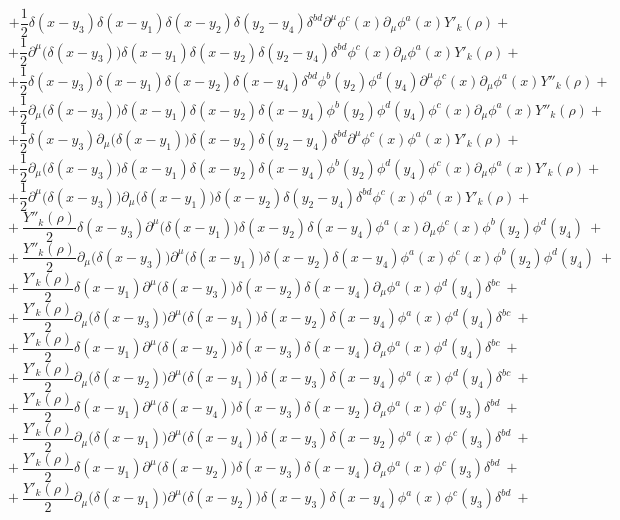 $$+ \frac{1}{2}\delta(x - y_3)\delta(x - y_1)\delta(x - y_2)\delta(y_2- y_4)\delta^{bd}\partial^\mu\phi^c(x)\partial_\mu\phi^a(x)Y'_k(\rho) + $$
$$+ \frac{1}{2}\partial^\mu\big(\delta(x - y_3)\big)\delta(x - y_1)\delta(x - y_2)\delta(y_2- y_4)\delta^{bd}\phi^c(x)\partial_\mu\phi^a(x)Y'_k(\rho) + $$
$$+ \frac{1}{2}\delta(x - y_3)\delta(x - y_1)\delta(x - y_2)\delta(x- y_4)\delta^{bd}\phi^b(y_2)\phi^d(y_4)\partial^\mu\phi^c(x)\partial_\mu\phi^a(x)Y''_k(\rho) + $$
$$+ \frac{1}{2}\partial_\mu\big(\delta(x - y_3)\big)\delta(x - y_1)\delta(x - y_2)\delta(x- y_4)\phi^b(y_2)\phi^d(y_4)\phi^c(x)\partial_\mu\phi^a(x)Y''_k(\rho) + $$
$$+ \frac{1}{2}\delta(x - y_3)\partial_\mu\big(\delta(x - y_1)\big)\delta(x - y_2)\delta(y_2 - y_4)\delta^{bd}\partial^\mu\phi^c(x)\phi^a(x)Y'_k(\rho) + $$
$$+ \frac{1}{2}\partial_\mu\big(\delta(x - y_3)\big)\delta(x - y_1)\delta(x - y_2)\delta(x- y_4)\phi^b(y_2)\phi^d(y_4)\phi^c(x)\partial_\mu\phi^a(x)Y'_k(\rho) + $$
$$+ \frac{1}{2}\partial^\mu\big(\delta(x - y_3)\big)\partial_\mu\big(\delta(x - y_1)\big)\delta(x - y_2)\delta(y_2- y_4)\delta^{bd}\phi^c(x)\phi^a(x)Y'_k(\rho) + $$
$$+\ \frac{Y''_k(\rho)}{2}\delta(x - y_3)\partial^\mu\big(\delta(x - y_1)\big)\delta(x - y_2)\delta(x - y_4)\phi^a(x)\partial_\mu\phi^c(x)\phi^b(y_2)\phi^d(y_4) \ +$$
$$+\ \frac{Y''_k(\rho)}{2}\partial_\mu\big(\delta(x - y_3)\big)\partial^\mu\big(\delta(x - y_1)\big)\delta(x - y_2)\delta(x - y_4)\phi^a(x)\phi^c(x)\phi^b(y_2)\phi^d(y_4) \ +$$
$$+\ \frac{Y'_k(\rho)}{2}\delta(x - y_1)\partial^\mu\big(\delta(x - y_3)\big)\delta(x - y_2)\delta(x - y_4)\partial_\mu\phi^a(x)\phi^d(y_4)\delta^{bc} \ +$$
$$+\ \frac{Y'_k(\rho)}{2}\partial_\mu\big(\delta(x - y_3)\big)\partial^\mu\big(\delta(x - y_1)\big)\delta(x - y_2)\delta(x - y_4)\phi^a(x)\phi^d(y_4)\delta^{bc} \ +$$
$$+\ \frac{Y'_k(\rho)}{2}\delta(x - y_1)\partial^\mu\big(\delta(x - y_2)\big)\delta(x - y_3)\delta(x - y_4)\partial_\mu\phi^a(x)\phi^d(y_4)\delta^{bc} \ +$$
$$+\ \frac{Y'_k(\rho)}{2}\partial_\mu\big(\delta(x - y_2)\big)\partial^\mu\big(\delta(x - y_1)\big)\delta(x - y_3)\delta(x - y_4)\phi^a(x)\phi^d(y_4)\delta^{bc} \ +$$
$$+\ \frac{Y'_k(\rho)}{2}\delta(x - y_1)\partial^\mu\big(\delta(x - y_4)\big)\delta(x - y_3)\delta(x - y_2)\partial_\mu\phi^a(x)\phi^c(y_3)\delta^{bd} \ +$$
$$+\ \frac{Y'_k(\rho)}{2}\partial_\mu\big(\delta(x - y_1)\big)\partial^\mu\big(\delta(x - y_4)\big)\delta(x - y_3)\delta(x - y_2)\phi^a(x)\phi^c(y_3)\delta^{bd} \ +$$
$$+\ \frac{Y'_k(\rho)}{2}\delta(x - y_1)\partial^\mu\big(\delta(x - y_2)\big)\delta(x - y_3)\delta(x - y_4)\partial_\mu\phi^a(x)\phi^c(y_3)\delta^{bd} \ +$$
$$+\ \frac{Y'_k(\rho)}{2}\partial_\mu\big(\delta(x - y_1)\big)\partial^\mu\big(\delta(x - y_2)\big)\delta(x - y_3)\delta(x - y_4)\phi^a(x)\phi^c(y_3)\delta^{bd} \ +$$
